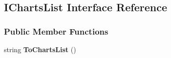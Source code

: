 \hypertarget{interfaceHighcharts_1_1IChartsList}{}\subsection{I\+Charts\+List Interface Reference}
\label{interfaceHighcharts_1_1IChartsList}
\subsubsection*{Public Member Functions}
\begin{DoxyCompactItemize}
\item 
\mbox{\label{interfaceHighcharts_1_1IChartsList_ae5263ba3c7ada40ab2538080496e8bf0}} 
string {\bfseries To\+Charts\+List} ()
\end{DoxyCompactItemize}
